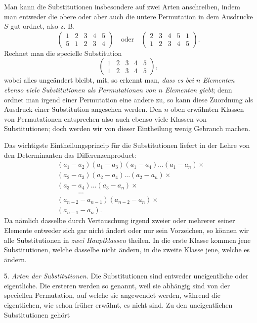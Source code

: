 \documentclass[10pt]{article}
\begin{document}
Man kann die Substitutionen insbesondere auf zwei Arten anschreiben, indem man entweder die obere oder aber auch die untere Permutation in dem Ausdrucke \(S\) gut ordnet, also z. B.
\[
\begin{pmatrix}1&2&3&4&5\\5&1&2&3&4\end{pmatrix}
\quad\text{oder}\quad
\begin{pmatrix}2&3&4&5&1\\1&2&3&4&5\end{pmatrix}.
\]
Rechnet man die specielle Substitution
\[
\begin{pmatrix}1&2&3&4&5\\1&2&3&4&5\end{pmatrix},
\]
wobei alles ungeändert bleibt, mit, so erkennt man, \emph{dass es bei \(n\) Elementen ebenso viele Substitutionen als Permutationen von \(n\) Elementen giebt}; denn ordnet man irgend einer Permutation eine andere zu, so kann diese Zuordnung als Ausdruck einer Substitution angesehen werden. Den \(n\) oben erwähnten Klassen von Permutationen entsprechen also auch ebenso viele Klassen von Substitutionen; doch werden wir von dieser Eintheilung wenig Gebrauch machen.

Das wichtigste Eintheilungsprincip für die Substitutionen liefert in der Lehre von den Determinanten das Differenzenproduct:
\[
\begin{aligned}
&(a_1-a_2)(a_1-a_3)(a_1-a_4)\ldots(a_1-a_n)\times\\
&(a_2-a_3)(a_2-a_4)\ldots(a_2-a_n)\times\\
&(a_3-a_4)\ldots(a_3-a_n)\times\\
&\hspace{3em}\ldots\\
&(a_{n-2}-a_{n-1})(a_{n-2}-a_n)\times\\
&(a_{n-1}-a_n).
\end{aligned}
\]
Da nämlich dasselbe durch Vertauschung irgend zweier oder mehrerer seiner Elemente entweder sich gar nicht ändert oder nur sein Vorzeichen, so können wir alle Substitutionen in \emph{zwei Hauptklassen} theilen. In die erste Klasse kommen jene Substitutionen, welche dasselbe nicht ändern, in die zweite Klasse jene, welche es ändern.

5. \emph{Arten der Substitutionen.} Die Substitutionen sind entweder uneigentliche oder eigentliche. Die ersteren werden so genannt, weil sie abhängig sind von der speciellen Permutation, auf welche sie angewendet werden, während die eigentlichen, wie schon früher erwähnt, es nicht sind. Zu den uneigentlichen Substitutionen gehört
\end{document}
